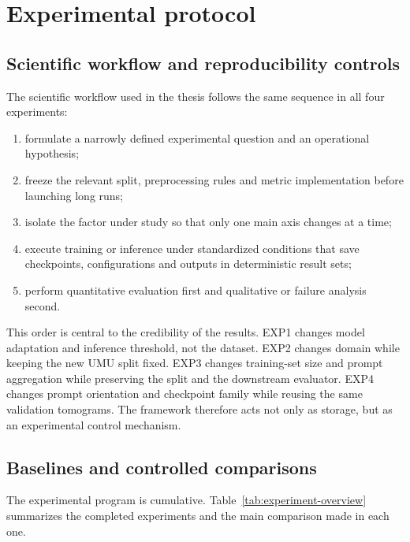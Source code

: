 \documentclass[12pt,a4paper]{report}
\begin{document}
\section{Experimental protocol}

\subsection{Scientific workflow and reproducibility controls}
The scientific workflow used in the thesis follows the same sequence in all four experiments:
\begin{enumerate}
  \item formulate a narrowly defined experimental question and an operational hypothesis;
  \item freeze the relevant split, preprocessing rules and metric implementation before launching long runs;
  \item isolate the factor under study so that only one main axis changes at a time;
  \item execute training or inference under standardized conditions that save checkpoints, configurations and outputs in deterministic result sets;
  \item perform quantitative evaluation first and qualitative or failure analysis second.
\end{enumerate}

This order is central to the credibility of the results. EXP1 changes model adaptation and inference threshold, not the dataset. EXP2 changes domain while keeping the new UMU split fixed. EXP3 changes training-set size and prompt aggregation while preserving the split and the downstream evaluator. EXP4 changes prompt orientation and checkpoint family while reusing the same validation tomograms. The framework therefore acts not only as storage, but as an experimental control mechanism.

\subsection{Baselines and controlled comparisons}
The experimental program is cumulative. Table~\ref{tab:experiment-overview} summarizes the completed experiments and the main comparison made in each one.
\end{document}
